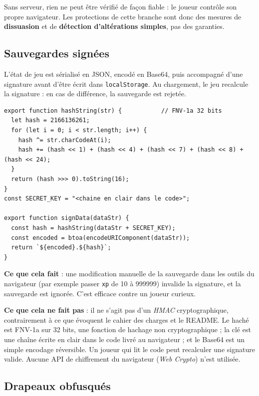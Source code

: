 \documentclass[11pt,a4paper]{report}
\newcommand{\file}[1]{\texttt{\nolinkurl{#1}}}
\begin{document}
Sans serveur, rien ne peut \^etre v\'erifi\'e de fa\c con fiable : le joueur contr\^ole son
propre navigateur. Les protections de cette branche sont donc des mesures de
\textbf{dissuasion} et de \textbf{d\'etection d'alt\'erations simples}, pas des garanties.

\subsection{Sauvegardes sign\'ees}

L'\'etat de jeu est s\'erialis\'e en JSON, encod\'e en Base64, puis accompagn\'e d'une
signature avant d'\^etre \'ecrit dans \texttt{localStorage}. Au chargement, le jeu
recalcule la signature : en cas de diff\'erence, la sauvegarde est rejet\'ee.

\begin{lstlisting}[style=js,caption={Signature des sauvegardes (\file{engine/cryptoUtils.js}, simplifi\'e)}]
export function hashString(str) {           // FNV-1a 32 bits
  let hash = 2166136261;
  for (let i = 0; i < str.length; i++) {
    hash ^= str.charCodeAt(i);
    hash += (hash << 1) + (hash << 4) + (hash << 7) + (hash << 8) + (hash << 24);
  }
  return (hash >>> 0).toString(16);
}
const SECRET_KEY = "<chaine en clair dans le code>";

export function signData(dataStr) {
  const hash = hashString(dataStr + SECRET_KEY);
  const encoded = btoa(encodeURIComponent(dataStr));
  return `${encoded}.${hash}`;
}
\end{lstlisting}

\textbf{Ce que cela fait} : une modification manuelle de la sauvegarde dans les outils
du navigateur (par exemple passer \texttt{xp} de 10 \`a 999999) invalide la signature, et
la sauvegarde est ignor\'ee. C'est efficace contre un joueur curieux.

\textbf{Ce que cela ne fait pas} : il ne s'agit pas d'un \emph{HMAC} cryptographique,
contrairement \`a ce que \'evoquent le cahier des charges et le README. Le hach\'e est
FNV-1a sur 32 bits, une fonction de hachage non cryptographique ; la \og cl\'e \fg{} est une
cha\^ine \'ecrite en clair dans le code livr\'e au navigateur ; et le Base64 est un simple
encodage r\'eversible. Un joueur qui lit le code peut recalculer une signature valide.
Aucune API de chiffrement du navigateur (\emph{Web Crypto}) n'est utilis\'ee.

\subsection{Drapeaux obfusqu\'es}
\end{document}
